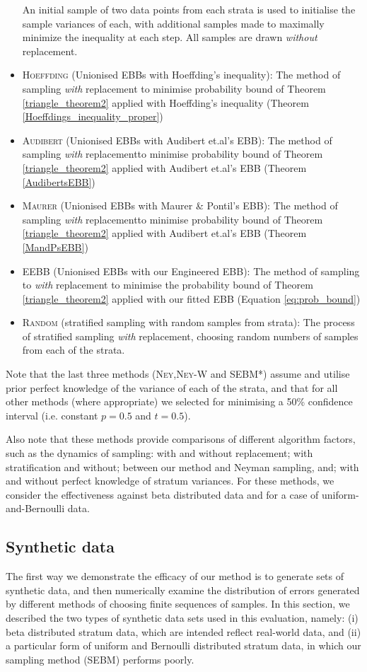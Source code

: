 \begin{itemize}
An initial sample of two data points from each strata is used to initialise the sample variances of each, with additional samples made to maximally minimize the inequality at each step. All samples are drawn \textit{without} replacement.
\item \textsc{Hoeffding} (Unionised EBBs with Hoeffding's inequality): The method of sampling \textit{with} replacement to minimise probability bound of Theorem \ref{triangle_theorem2} applied with Hoeffding's inequality (Theorem \ref{Hoeffdings_inequality_proper})
\item \textsc{Audibert} (Unionised EBBs with Audibert et.al's EBB): The method of sampling \textit{with} replacementto minimise probability bound of Theorem \ref{triangle_theorem2} applied with Audibert et.al's EBB (Theorem \ref{AudibertsEBB})
\item \textsc{Maurer} (Unionised EBBs with Maurer \& Pontil's EBB): The method of sampling \textit{with} replacementto minimise probability bound of Theorem \ref{triangle_theorem2} applied with Audibert et.al's EBB (Theorem \ref{MandPsEBB})
\item \textsc{EEBB} (Unionised EBBs with our Engineered EBB): The method of sampling to \textit{with} replacement to minimise the probability bound of Theorem \ref{triangle_theorem2} applied with our fitted EBB (Equation \ref{eq:prob_bound})
\item \textsc{Random} (stratified sampling with random samples from strata): The process of stratified sampling \textit{with} replacement, choosing random numbers of samples from each of the strata.
\end{itemize}
Note that the last three methods (\textsc{Ney},\textsc{Ney-W} and SEBM*) assume and utilise prior perfect knowledge of the variance of each of the strata, and that for all other methods (where appropriate) we selected for minimising a 50\% confidence interval (i.e. constant $p=0.5$ and $t=0.5$).

Also note that these methods provide comparisons of different algorithm factors, such as the dynamics of sampling: with and without replacement; with stratification and without; between our method and Neyman sampling, and; with and without perfect knowledge of stratum variances. 
For these methods, we consider the effectiveness against beta distributed data and for a case of uniform-and-Bernoulli data.

\subsection{Synthetic data}
\label{ssec:SyntheticDists}
The first way we demonstrate the efficacy of our method is to generate sets of synthetic data, and then numerically examine the distribution of errors generated by different methods of choosing finite sequences of samples.
In this section, we described the two types of synthetic data sets used in this evaluation, namely: 
(i) beta distributed stratum data, which are intended reflect real-world data, and 
(ii) a particular form of uniform and Bernoulli distributed stratum data, in which our sampling method (SEBM) performs poorly.

